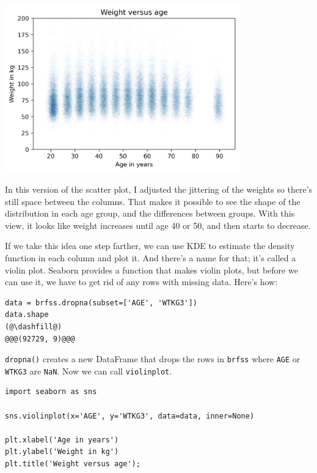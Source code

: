 \begin{center}
\includegraphics[width=4in]{09_relationships_files/09_relationships_39_0.png}
\end{center}

In this version of the scatter plot, I adjusted the jittering of the
weights so there's still space between the columns. That makes it
possible to see the shape of the distribution in each age group, and the
differences between groups. With this view, it looks like weight
increases until age 40 or 50, and then starts to decrease.

If we take this idea one step farther, we can use KDE to estimate the
density function in each column and plot it. And there's a name for
that; it's called a violin plot. Seaborn provides a function that makes
violin plots, but before we can use it, we have to get rid of any rows
with missing data. Here's how:

\begin{lstlisting}[]
data = brfss.dropna(subset=['AGE', 'WTKG3'])
data.shape
(@\dashfill@)
@@@(92729, 9)@@@
\end{lstlisting}

\passthrough{\lstinline!dropna()!} creates a new DataFrame that drops
the rows in \passthrough{\lstinline!brfss!} where
\passthrough{\lstinline!AGE!} or \passthrough{\lstinline!WTKG3!} are
\passthrough{\lstinline!NaN!}. Now we can call
\passthrough{\lstinline!violinplot!}.

\begin{lstlisting}[]
import seaborn as sns

sns.violinplot(x='AGE', y='WTKG3', data=data, inner=None)

plt.xlabel('Age in years')
plt.ylabel('Weight in kg')
plt.title('Weight versus age');
\end{lstlisting}

